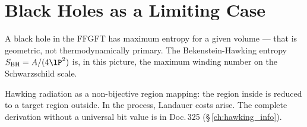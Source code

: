 \section{Black Holes as a Limiting Case}

A black hole in the FFGFT has maximum entropy for a given
volume --- that is geometric, not thermodynamically primary.
The Bekenstein-Hawking entropy $S_{\text{BH}} = A/(4\lP^2)$ is, in
this picture, the maximum winding number on the Schwarzschild scale.

Hawking radiation as a non-bijective region mapping: the region inside
is reduced to a target region outside. In the process, Landauer costs arise.
The complete derivation without a universal bit value is in Doc.\,325
(\S\,\ref{ch:hawking_info}). 